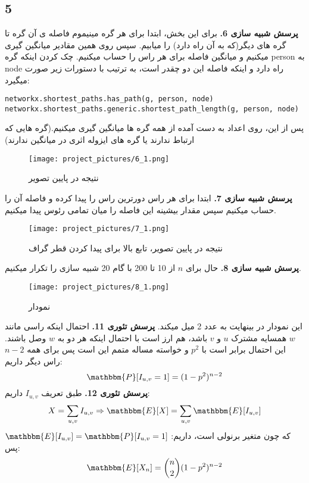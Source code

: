 \documentclass[11pt]{article}
\begin{document}
\begin{persian}
\section*{5}
\textbf{پرسش شبیه سازی 6.}
برای این بخش، ابتدا برای هر گره مینیموم فاصله ی آن گره تا گره های دیگر(که به آن راه دارد) را میابیم. سپس روی همین مقادیر میانگین گیری میکنیم و میانگین فاصله برای هر راس را حساب میکنیم. چک کردن اینکه گره person به node راه دارد و اینکه فاصله این دو چقدر است، به ترتیب با دستورات زیر صورت میگیرد:
\begin{latin}
\lstset{language=python}
\begin{lstlisting}
networkx.shortest_paths.has_path(g, person, node)
networkx.shortest_paths.generic.shortest_path_length(g, person, node)
\end{lstlisting}
\end{latin}
پس از این، روی اعداد به دست آمده از همه گره ها میانگین گیری میکنیم.(گره هایی که ارتباط ندارند یا گره های ایزوله اثری در میانگین ندارند)
\begin{figure}[H]
\centerline{\texttt{[image: project\_pictures/6\_1.png]}}
\caption{نتیجه در پایین تصویر }
\end{figure} 
\textbf{پرسش شبیه سازی 7.}
ابتدا برای هر راس دورترین راس را پیدا کرده و فاصله آن را حساب میکنیم سپس مقدار بیشینه این فاصله را میان تمامی رئوس پیدا میکنیم.
\begin{figure}[H]
\centerline{\texttt{[image: project\_pictures/7\_1.png]}}
\caption{نتیجه در پایین تصویر، تابع بالا برای پیدا کردن قطر گراف }
\end{figure} 
\textbf{پرسش شبیه سازی 8.}
حال برای $n$ از 10 تا 200 با گام 20 شبیه سازی را تکرار میکنیم.
\begin{figure}[H]
\centerline{\texttt{[image: project\_pictures/8\_1.png]}}
\caption{نمودار }
\end{figure}
این نمودار در بینهایت به عدد 2 میل میکند.
\newline
\textbf{پرسش تئوری 11.}
احتمال اینکه راسی مانند $w$ همسایه مشترک $u$ و $v$ باشد، هم ارز است با احتمال اینکه هر دو به $w$ وصل باشند. این احتمال برابر است با $p^2$
و خواسته مساله متمم این است
پس برای همه $n-2$ راس دیگر داریم:
$$
\mathbbm{P}[I_{u,v} = 1] = (1 - p^2)^{n-2}
$$
\newline
\textbf{پرسش تئوری 12.}
طبق تعریف 
$I_{u,v}$
داریم:
$$
X = \sum_{u,v} I_{u,v} \Rightarrow \mathbbm{E}[X] = \sum_{u,v} \mathbbm{E}[I_{u,v}] 
$$ 
که چون متغیر برنولی است، داریم:
$\mathbbm{E} [I_{u,v}] = \mathbbm{P}[I_{u,v} = 1]$
پس:
$$
\mathbbm{E} [X_n] = {n \choose 2} (1-p^2)^{n-2} 
$$
\newline

\end{persian}
\end{document}
